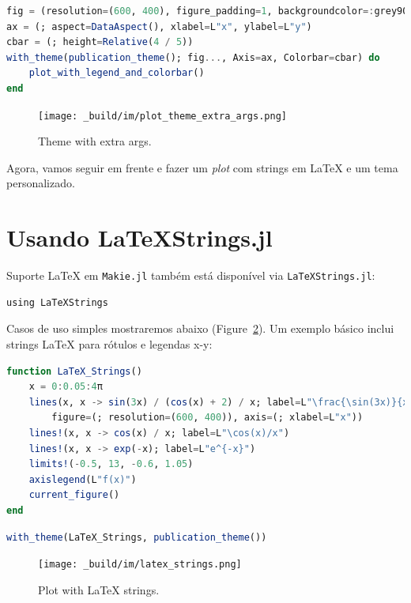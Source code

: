 \documentclass[
  notoc %
]{tufte-book}
\newcommand{\passthrough}[1]{#1}
\begin{document}
\begin{lstlisting}[language=Julia]
fig = (resolution=(600, 400), figure_padding=1, backgroundcolor=:grey90)
ax = (; aspect=DataAspect(), xlabel=L"x", ylabel=L"y")
cbar = (; height=Relative(4 / 5))
with_theme(publication_theme(); fig..., Axis=ax, Colorbar=cbar) do
    plot_with_legend_and_colorbar()
end
\end{lstlisting}

\begin{figure}
\hypertarget{fig:plot_theme_extra_args}{%
\centering
\texttt{[image: \_build/im/plot\_theme\_extra\_args.png]}
\caption{Theme with extra args.}\label{fig:plot_theme_extra_args}
}
\end{figure}

Agora, vamos seguir em frente e fazer um \emph{plot} com strings em
LaTeX e um tema personalizado.

\hypertarget{usando-latexstrings.jl}{%
\section{Usando LaTeXStrings.jl}\label{usando-latexstrings.jl}}

Suporte LaTeX em \passthrough{\lstinline!Makie.jl!} também está
disponível via \passthrough{\lstinline!LaTeXStrings.jl!}:

\begin{lstlisting}
using LaTeXStrings
\end{lstlisting}

Casos de uso simples mostraremos abaixo
(Figure~\ref{fig:latex_strings}). Um exemplo básico inclui strings LaTeX
para rótulos e legendas x-y:

\begin{lstlisting}[language=Julia]
function LaTeX_Strings()
    x = 0:0.05:4π
    lines(x, x -> sin(3x) / (cos(x) + 2) / x; label=L"\frac{\sin(3x)}{x(\cos(x)+2)}",
        figure=(; resolution=(600, 400)), axis=(; xlabel=L"x"))
    lines!(x, x -> cos(x) / x; label=L"\cos(x)/x")
    lines!(x, x -> exp(-x); label=L"e^{-x}")
    limits!(-0.5, 13, -0.6, 1.05)
    axislegend(L"f(x)")
    current_figure()
end
\end{lstlisting}

\begin{lstlisting}[language=Julia]
with_theme(LaTeX_Strings, publication_theme())
\end{lstlisting}

\begin{figure}
\hypertarget{fig:latex_strings}{%
\centering
\texttt{[image: \_build/im/latex\_strings.png]}
\caption{Plot with LaTeX strings.}\label{fig:latex_strings}
}
\end{figure}
\end{document}
